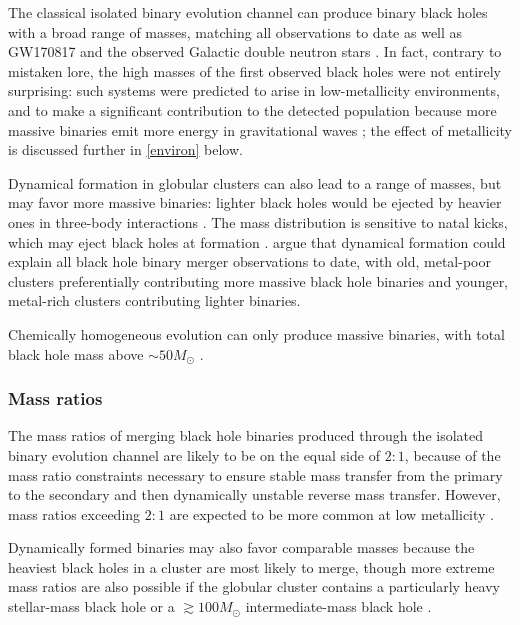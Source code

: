 \documentclass[iop,onecolumn]{revtex4}
\begin{document}
The classical isolated binary evolution channel can produce binary black holes with a broad range of masses, matching all observations to date \citep[e.g.,][]{Stevenson:2017,Eldridge:2017,GiacobboMapelli:2018} as well as GW170817 and the observed Galactic double neutron stars \citep[e.g.,][]{Kruckow:2018,VignaGomez:2018}.  In fact, contrary to mistaken lore, the high masses of the first observed black holes were not entirely surprising: such systems were predicted to arise in low-metallicity environments, and to make a significant contribution to the detected population because more massive binaries emit more energy in gravitational waves \citep{Dominik:2014}; the effect of metallicity is discussed further in \autoref{environ} below. 

Dynamical formation in globular clusters can also lead to a range of masses, but may favor more massive binaries: lighter black holes would be ejected by heavier ones in three-body interactions \citep{Rodriguez:2015}. The mass distribution is sensitive to natal kicks, which may eject black holes at formation \citep{Zevin:2017}.  \citet{Chatterjee:2017} argue that dynamical formation could explain all black hole binary merger observations to date, with old, metal-poor clusters preferentially contributing more massive black hole binaries and younger, metal-rich clusters contributing lighter binaries.
 
Chemically homogeneous evolution can only produce massive binaries, with total black hole mass above $\sim 50 M_\odot$ \citep{MandeldeMink:2016,Marchant:2016}.

\subsubsection{Mass ratios}
The mass ratios of merging black hole binaries produced through the isolated binary evolution channel are likely to be on the equal side of $2:1$, because of the mass ratio constraints necessary to ensure stable mass transfer from the primary to the secondary and then dynamically unstable reverse mass transfer. However, mass ratios exceeding $2:1$ are expected to be more common at low metallicity \citep{Dominik:2012,Stevenson:2017}.

Dynamically formed binaries may also favor comparable masses because the heaviest black holes in a cluster are most likely to merge, though more extreme mass ratios are also possible if the globular cluster contains a particularly heavy stellar-mass black hole or a $\gtrsim 100 M_\odot$ intermediate-mass black hole \citep{Mandel:2008,Belczynski:2014VMS}. 
\end{document}
